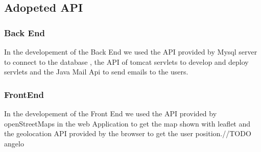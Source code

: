 \subsection{Adopeted API}
\subsubsection{Back End}
In the developement of the Back End we used the API provided by Mysql server to connect to the database , the API of tomcat servlets to develop and deploy servlets and the Java Mail Api to send emails to the users.
\subsubsection{FrontEnd}
In the developement of the Front End we used the API provided by openStreetMaps in the web Application to get the map shown with leaflet and the geolocation API provided by the browser to get the user position.//TODO angelo


